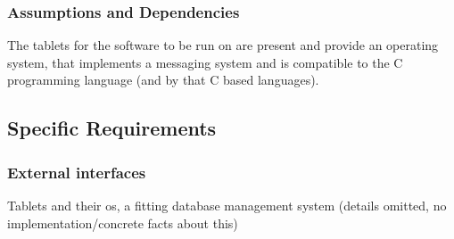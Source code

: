 	\subsubsection{Assumptions and Dependencies}
		The tablets for the software to be run on are present and provide an operating system, that implements a messaging system and is compatible to the C programming language (and by that C based languages).


\subsection{Specific Requirements}

\subsubsection{External interfaces}
Tablets and their os, a fitting database management system (details omitted, no implementation/concrete facts about this)

